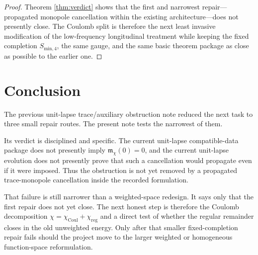 \documentclass[11pt]{article}
\begin{document}
\begin{proof}
Theorem \ref{thm:verdict} shows that the first and narrowest repair---propagated monopole cancellation within the existing architecture---does not presently close. The Coulomb split is therefore the next least invasive modification of the low-frequency longitudinal treatment while keeping the fixed completion \(S_{\mathrm{min},4}\), the same gauge, and the same basic theorem package as close as possible to the earlier one.
\end{proof}

\section{Conclusion}

The previous unit-lapse trace/auxiliary obstruction note reduced the next task to three small repair routes. The present note tests the narrowest of them.

Its verdict is disciplined and specific. The current unit-lapse compatible-data package does not presently imply \(\mathfrak m_\chi(0)=0\), and the current unit-lapse evolution does not presently prove that such a cancellation would propagate even if it were imposed. Thus the obstruction is not yet removed by a propagated trace-monopole cancellation inside the recorded formulation.

That failure is still narrower than a weighted-space redesign. It says only that the first repair does not yet close. The next honest step is therefore the Coulomb decomposition \(\chi=\chi_{\mathrm{Coul}}+\chi_{\mathrm{reg}}\) and a direct test of whether the regular remainder closes in the old unweighted energy. Only after that smaller fixed-completion repair fails should the project move to the larger weighted or homogeneous function-space reformulation.
\end{document}
